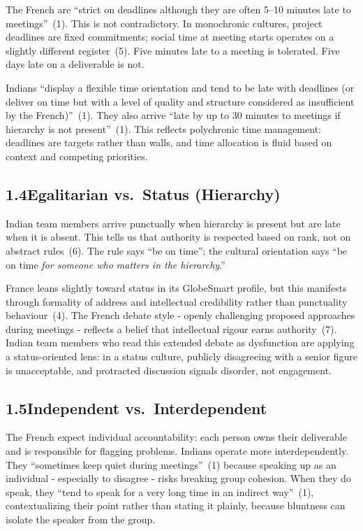 \documentclass[12pt, a4paper]{article}
\begin{document}
The French are ``strict on deadlines although they are often 5--10 minutes late to meetings''~(1). This is not contradictory. In monochronic cultures, project deadlines are fixed commitments; social time at meeting starts operates on a slightly different register~(5). Five minutes late to a meeting is tolerated. Five days late on a deliverable is not.

Indians ``display a flexible time orientation and tend to be late with deadlines (or deliver on time but with a level of quality and structure considered as insufficient by the French)''~(1). They also arrive ``late by up to 30 minutes to meetings if hierarchy is not present''~(1). This reflects polychronic time management: deadlines are targets rather than walls, and time allocation is fluid based on context and competing priorities.

\subsection*{1.4\quad Egalitarian vs.\ Status (Hierarchy)}

Indian team members arrive punctually when hierarchy is present but are late when it is absent. This tells us that authority is respected based on rank, not on abstract rules~(6). The rule says ``be on time''; the cultural orientation says ``be on time \textit{for someone who matters in the hierarchy}.''

France leans slightly toward status in its GlobeSmart profile, but this manifests through formality of address and intellectual credibility rather than punctuality behaviour~(4). The French debate style - openly challenging proposed approaches during meetings - reflects a belief that intellectual rigour earns authority~(7). Indian team members who read this extended debate as dysfunction are applying a status-oriented lens: in a status culture, publicly disagreeing with a senior figure is unacceptable, and protracted discussion signals disorder, not engagement.

\subsection*{1.5\quad Independent vs.\ Interdependent}

The French expect individual accountability: each person owns their deliverable and is responsible for flagging problems. Indians operate more interdependently. They ``sometimes keep quiet during meetings''~(1) because speaking up as an individual - especially to disagree - risks breaking group cohesion. When they do speak, they ``tend to speak for a very long time in an indirect way''~(1), contextualizing their point rather than stating it plainly, because bluntness can isolate the speaker from the group.
\end{document}
